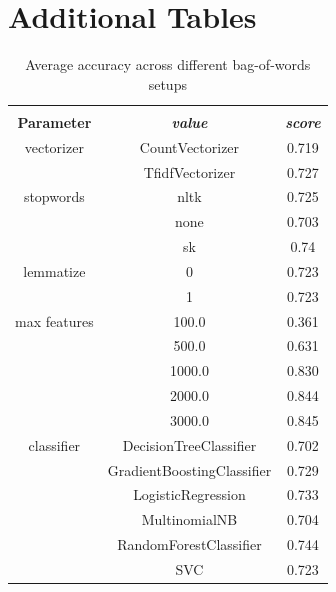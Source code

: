 \documentclass[conference]{IEEEtran}
\begin{document}



\appendices
\section{Additional Tables}
\label{FirstAppendix}

\begin{table}[htbp]
\caption{Average accuracy across different bag-of-words setups}
\begin{center}
\begin{tabular}{|c|c|c|}
\hline
\textbf{}&\multicolumn{2}{|c|}{\textbf{}} \\ 
\cline{2-3}
\textbf{Parameter} & \textbf{\textit{value}}& \textbf{\textit{score}} \\ 
\hline
vectorizer & CountVectorizer & 0.719 \\ 
\cline{2-3}
 & TfidfVectorizer & 0.727 \\ 
\hline
stopwords & nltk & 0.725 \\ 
\cline{2-3}
 & none & 0.703 \\ 
\cline{2-3}
 & sk & 0.74 \\ 
\hline
lemmatize & 0 & 0.723 \\ 
\cline{2-3}
 & 1 & 0.723 \\ 
\hline
max features & 100.0 & 0.361 \\ 
\cline{2-3}
 & 500.0 & 0.631 \\ 
\cline{2-3}
 & 1000.0 & 0.830 \\ 
\cline{2-3}
 & 2000.0 & 0.844 \\ 
\cline{2-3}
 & 3000.0 & 0.845 \\ 
\hline
classifier & DecisionTreeClassifier & 0.702 \\ 
\cline{2-3}
 & GradientBoostingClassifier & 0.729 \\ 
\cline{2-3}
 & LogisticRegression & 0.733 \\ 
\cline{2-3}
 & MultinomialNB & 0.704 \\ 
\cline{2-3}
 & RandomForestClassifier & 0.744 \\ 
\cline{2-3}
 & SVC & 0.723 \\ 
\hline
\end{tabular}
\label{taba5}
\end{center}
\end{table}
\end{document}

